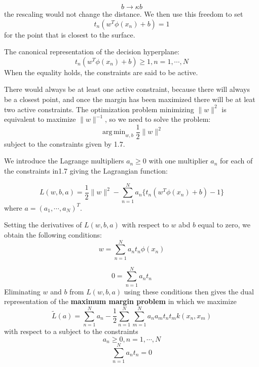 \documentclass[twoside]{article}
\DeclareMathOperator*{\argmin}{arg\,min}
\begin{document}
\begin{equation}
b \rightarrow \kappa b
\end{equation}
the rescaling would not change the distance.
We then use this freedom to set 
\begin{equation}
t_n(w^T \phi(x_n)+b)=1
\end{equation}
for the point that is closest to the surface.  

The canonical representation of the decision hyperplane:
\begin{equation}
t_n(w^T \phi(x_n)+b) \geq 1,   n = 1,\cdots, N
\end{equation}
When the equality holds, the constraints are said to be active.

There would always be at least one active constraint, because there will always be a closest point, and once the margin has been maximized there will be at leat two active constraints.  The optimization problem minimizing $\lVert w \rVert ^2$ is equivalent to maximize $\lVert w \rVert^{-1}$, so we need to solve the problem:
\begin{equation}
\argmin_{w,b} \frac{1}{2} \lVert w \rVert ^2
\end{equation}
subject to the constraints given by 1.7.

We introduce the Lagrange multipliers $a_n \geq 0$ with one multiplier $a_n$ for each of the constraints in1.7 giving the Lagrangian function:

\begin{equation}
L(w,b,a) = \frac{1}{2} \lVert w \rVert^2 - \sum_{n=1}^{N} a_n \{t_n(w^T \phi(x_n)+b)-1\}
\end{equation}
where $a=(a_1,\cdots,a_N)^T$.

Setting the derivatives of $L(w, b, a)$ with respect to $w$ abd $b$ equal to zero, we obtain the following conditions:
\begin{equation}
w= \sum_{n=1}^{N} a_n t_n \phi(x_n)
\end{equation}

\begin{equation}
0 = \sum_{n=1}^{N}a_nt_n
\end{equation}
Eliminating $w$ and $b$ from $L(w, b, a)$ using these conditions then gives the dual representation of the \textbf{maximum margin problem} in which we maximize
\begin{equation}
\tilde{L}(a) = \sum_{n=1}^{N}a_n - \frac{1}{2}\sum_{n=1}^{N}\sum_{m=1}^{N} a_na_mt_nt_mk(x_n,x_m)
\end{equation}
with respect to a subject to the constraints
\begin{equation}
a_n \geq 0,n = 1,\cdots,N
\end{equation}
\begin{equation}
\sum_{n=1}^{N}  a_nt_n = 0
\end{equation}
\end{document}
